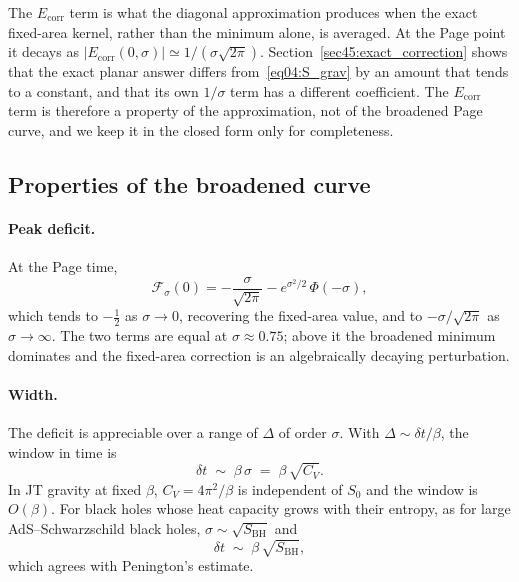 \documentclass[11pt,letterpaper]{article}
\theoremstyle{plain}
\theoremstyle{definition}
\theoremstyle{remark}
\begin{document}
The $E_{\mathrm{corr}}$ term is what the diagonal approximation produces when the exact fixed-area kernel, rather than the minimum alone, is averaged. At the Page point it decays as $|E_{\mathrm{corr}}(0,\sigma)| \simeq 1/(\sigma\sqrt{2\pi})$. Section~\ref{sec45:exact_correction} shows that the exact planar answer differs from~\eqref{eq04:S_grav} by an amount that tends to a constant, and that its own $1/\sigma$ term has a different coefficient. The $E_{\mathrm{corr}}$ term is therefore a property of the approximation, not of the broadened Page curve, and we keep it in the closed form only for completeness.

\subsection{Properties of the broadened curve}
\label{subsec04:properties}

\paragraph{Peak deficit.} At the Page time,
\begin{equation}
\label{eq04:peak_deficit}
\mathcal{F}_\sigma(0) = -\frac{\sigma}{\sqrt{2\pi}} - e^{\sigma^2/2}\,\Phi(-\sigma),
\end{equation}
which tends to $-\tfrac12$ as $\sigma \to 0$, recovering the fixed-area value, and to $-\sigma/\sqrt{2\pi}$ as $\sigma \to \infty$. The two terms are equal at $\sigma \approx 0.75$; above it the broadened minimum dominates and the fixed-area correction is an algebraically decaying perturbation.

\paragraph{Width.} The deficit is appreciable over a range of $\Delta$ of order $\sigma$. With $\Delta \sim \delta t/\beta$, the window in time is
\begin{equation}
\label{eq04:width_time_general}
\delta t \;\sim\; \beta\,\sigma \;=\; \beta\,\sqrt{C_V} .
\end{equation}
In JT gravity at fixed $\beta$, $C_V = 4\pi^2/\beta$ is independent of $S_0$ and the window is $O(\beta)$. For black holes whose heat capacity grows with their entropy, as for large AdS--Schwarzschild black holes, $\sigma \sim \sqrt{S_{\mathrm{BH}}}$ and
\begin{equation}
\label{eq04:width_time_highD}
\delta t \;\sim\; \beta\,\sqrt{S_{\mathrm{BH}}},
\end{equation}
which agrees with Penington's estimate.
\end{document}
